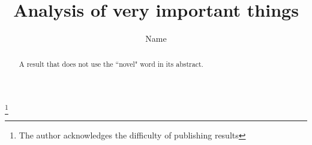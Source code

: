 \documentclass{ifacconf}
\begin{document}
\begin{frontmatter}
\title{Analysis of very important things} 
\thanks[footnoteinfo]{The author acknowledges the difficulty of publishing results}
\author[First]{Name} 
\address[First]{Return to sender (e-mail: {mr.author@tex.com} )}
\begin{abstract} 
A result that does not use the ``novel" word in its abstract.
\end{abstract}
\end{frontmatter}
\end{document}

